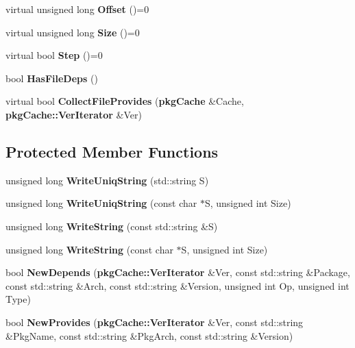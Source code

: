 \begin{DoxyCompactItemize}
\item 
virtual unsigned long {\bfseries \-Offset} ()=0\label{classpkgCacheGenerator_1_1ListParser_afbff141d2144e3af657c2d86eff2574e}

\item 
virtual unsigned long {\bfseries \-Size} ()=0\label{classpkgCacheGenerator_1_1ListParser_ab510031011ec4c694af0f34f747e504b}

\item 
virtual bool {\bfseries \-Step} ()=0\label{classpkgCacheGenerator_1_1ListParser_a8924e033a9be582dfccaf68f84812f03}

\item 
bool {\bfseries \-Has\-File\-Deps} ()\label{classpkgCacheGenerator_1_1ListParser_a9e0b5c33f099ed1cee4a02f892862459}

\item 
virtual bool {\bfseries \-Collect\-File\-Provides} ({\bf pkg\-Cache} \&\-Cache, {\bf pkg\-Cache\-::\-Ver\-Iterator} \&\-Ver)\label{classpkgCacheGenerator_1_1ListParser_ac8e52265927872cf8e62a1ae5202f0d9}

\end{DoxyCompactItemize}
\subsection*{\-Protected \-Member \-Functions}
\begin{DoxyCompactItemize}
\item 
unsigned long {\bfseries \-Write\-Uniq\-String} (std\-::string \-S)\label{classpkgCacheGenerator_1_1ListParser_a2fd10049fca512620eefaa30a6c342c1}

\item 
unsigned long {\bfseries \-Write\-Uniq\-String} (const char $\ast$\-S, unsigned int \-Size)\label{classpkgCacheGenerator_1_1ListParser_a7d30e2b172fba6814b3d036cfd9d5edf}

\item 
unsigned long {\bfseries \-Write\-String} (const std\-::string \&\-S)\label{classpkgCacheGenerator_1_1ListParser_a0329447b4c2764617ff943a89213b0c6}

\item 
unsigned long {\bfseries \-Write\-String} (const char $\ast$\-S, unsigned int \-Size)\label{classpkgCacheGenerator_1_1ListParser_a69995749f8bff97c113406876312a47a}

\item 
bool {\bfseries \-New\-Depends} ({\bf pkg\-Cache\-::\-Ver\-Iterator} \&\-Ver, const std\-::string \&\-Package, const std\-::string \&\-Arch, const std\-::string \&\-Version, unsigned int \-Op, unsigned int \-Type)\label{classpkgCacheGenerator_1_1ListParser_acd4435888f96d969607e9d74127dd208}

\item 
bool {\bfseries \-New\-Provides} ({\bf pkg\-Cache\-::\-Ver\-Iterator} \&\-Ver, const std\-::string \&\-Pkg\-Name, const std\-::string \&\-Pkg\-Arch, const std\-::string \&\-Version)\label{classpkgCacheGenerator_1_1ListParser_a47d169cee60b75ad1ecaf9e1a4142313}

\end{DoxyCompactItemize}

